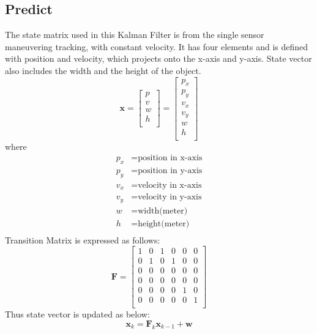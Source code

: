 \subsection{Predict}\label{sec:2-predict}
The state matrix used in this Kalman Filter \cite{kalman} is from the single sensor maneuvering tracking, with constant velocity.
It has four elements and is defined with position and velocity, which projects onto the x-axis and y-axis.
State vector also includes the width and the height of the object\cite{4732695}.
\begin{equation}\label{equ:state_eq}
    \mathbf{x} = 
        \begin{bmatrix} 
        p \\ 
        v \\
        w \\
        h \\

        \end{bmatrix} = 
        \begin{bmatrix} 
        p_x \\ 
        p_y \\ 
        v_x \\ 
        v_y \\
        w \\
        h \\
        \end{bmatrix}
\end{equation}
where
\begin{align*}
    p_x &=\text{position in x-axis}\\
    p_y &=\text{position in y-axis}\\
    v_x &=\text{velocity in x-axis}\\
    v_y &=\text{velocity in y-axis}\\
    w &=\text{width(meter)}\\%
    h &=\text{height(meter)}\\
\end{align*}
Transition Matrix is expressed as follows:
\begin{equation}\label{equ:transition_matrix_H}
    \mathbf{F} = 
    \begin{bmatrix}
        1 & 0 & 1 & 0 & 0 & 0\\
        0 & 1 & 0 & 1 & 0 & 0\\
        0 & 0 & 0 & 0 & 0 & 0\\
        0 & 0 & 0 & 0 & 0 & 0\\
        0 & 0 & 0 & 0 & 1 & 0\\
        0 & 0 & 0 & 0 & 0 & 1\\
      \end{bmatrix}
\end{equation}
Thus state vector is updated as below:
\begin{equation}\label{equ:predict_eq}
    \mathbf{x}_k=\mathbf{F}_k\mathbf{x}_{k-1}+\mathbf{w}
\end{equation}


